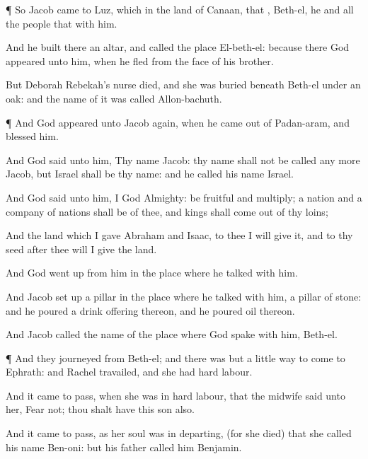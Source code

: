 {\par }{\PP {}¶ So
Jacob
came to
Luz, which
{} in the
land of
Canaan, that
{},
Beth-el, he and all the
people that
{} with him.

And he
built there an
altar, and
called the
place
El-beth-el: because there
God
appeared unto him, when he
fled from the
face of his
brother.

But
Deborah
Rebekah’s
nurse
died, and she was
buried beneath
Beth-el under an
oak: and the
name of it was
called
Allon-bachuth.


\par }{\PP {}¶ And
God
appeared unto
Jacob again, when he
came out of
Padan-aram, and
blessed him.

And
God
said unto him, Thy
name
{}
Jacob: thy
name shall not be
called any more
Jacob, but
Israel shall be thy
name: and he
called his
name
Israel.

And
God
said unto him, I
{}
God
Almighty: be
fruitful and
multiply; a
nation and a
company of
nations shall be of thee, and
kings shall
come out of thy
loins;

And the
land which I
gave
Abraham and
Isaac, to thee I will give
it, and to thy
seed after
thee will I
give the
land.

And
God went
up from him in the
place where he
talked with him.

And
Jacob set
up a
pillar in the
place where he
talked with him,
{} a
pillar of
stone: and he
poured a drink
offering thereon, and he
poured
oil thereon.

And
Jacob
called the
name of the
place where
God
spake with him,
Beth-el.


\par }{\PP {}¶ And they
journeyed from
Beth-el; and there was
but a
little
way to
come to
Ephrath: and
Rachel
travailed, and she had
hard
labour.

And it came to pass, when she was in
hard
labour, that the
midwife
said unto her,
Fear not; thou shalt have this
son also.

And it came to pass, as her
soul was in
departing, (for she
died) that she
called his
name
Ben-oni: but his
father
called him
Benjamin.

}
